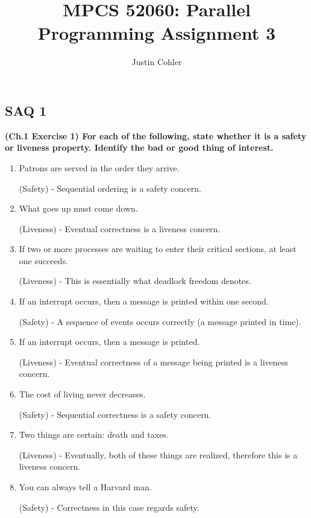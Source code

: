 \documentclass[12pt]{article}
\begin{document}
\title{MPCS 52060: Parallel Programming Assignment 3}
\author{Justin Cohler}

\maketitle

\subsection*{SAQ 1} 
\textbf{(Ch.1 Exercise 1) For each of the following, state whether it is a safety or liveness property. Identify the bad or good thing of interest.}

\begin{enumerate}
    \item Patrons are served in the order they arrive.

    (Safety) - Sequential ordering is a safety concern.
    \item What goes up must come down.
    
    (Liveness) - Eventual correctness is a liveness concern.
    \item If two or more processes are waiting to enter their critical sections, at least one succeeds.
    
    (Liveness) - This is essentially what deadlock freedom denotes.
   \item If an interrupt occurs, then a message is printed within one second. 
   
   (Safety) - A sequence of events occurs correctly (a message printed in time).
   \item If an interrupt occurs, then a message is printed.
    
    (Liveness) - Eventual correctness of a message being printed is a liveness concern.
    \item The cost of living never decreases.
    
    (Safety) - Sequential correctness is a safety concern.
    \item Two things are certain: death and taxes.
    
    (Liveness) - Eventually, both of these things are realized, therefore this is a liveness concern.
    \item You can always tell a Harvard man.
    
    (Safety) - Correctness in this case regards safety.
\end{enumerate}

\vspace{5mm}
\end{document}
